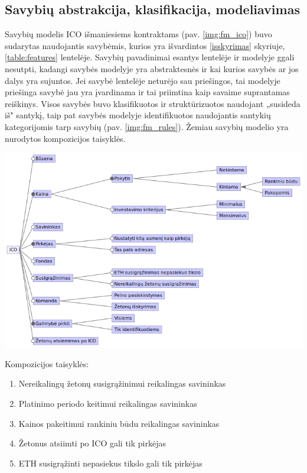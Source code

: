 \documentclass{VUMIFPSkursinis}
\begin{document}
\subsection{Savybių abstrakcija, klasifikacija, modeliavimas} \label{modelis}

Savybių modelis ICO išmaniesiems kontraktams (pav. \ref{img:fm_ico}) buvo sudarytas naudojantis savybėmis, kurios yra išvardintos \ref{isskyrimas} skyriuje, \ref{table:features} lentelėje. Savybių pavadinimai esantys lentelėje ir modelyje ggali nesutpti, kadangi savybės modelyje yra abstraktesnės ir kai kurios savybės ar jos dalys yra sujuntos. Jei savybė lentelėje neturėjo sau priešingos, tai modelyje priešinga savybė jau yra įvardinama ir tai priimtina kaip savaime suprantamas reiškinys. Visos savybės buvo klasifikuotos ir struktūrizuotos naudojant „susideda iš" santykį, taip pat savybės modelyje identifikuotos naudojantis santykių kategorijomis tarp savybių (pav. \ref{img:fm_rules}). Žemiau savybių modelio yra nurodytos kompozicijos taisyklės.

\pagebreak

\begin{center}
    \includegraphics[scale=0.65]{img/ico_model}
    \label{img:fm_ico}
\end{center}

Kompozicijos taisyklės:
\begin{enumerate}
\item Nereikalingų žetonų susigrąžinimui reikalingas savininkas
\item Platinimo periodo keitimui reikalingas savininkas
\item Kainos pakeitimui rankiniu būdu reikalingas savininkas
\item Žetonus atsiimti po ICO gali tik pirkėjas
\item ETH susigrąžinti nepasiekus tikslo gali tik pirkėjas
\end{enumerate}
\end{document}
